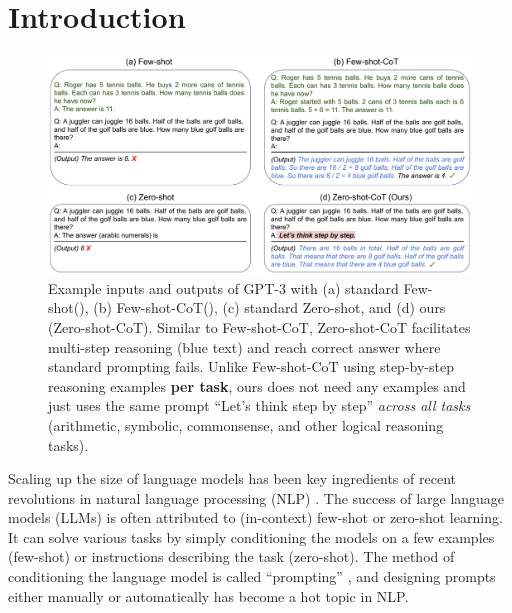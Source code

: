 \documentclass{article}
\newcommand{\kojima}[1]{{\color{red}[{#1} --TK]}}
\newcommand{\yi}[1]{{\color{magenta}[{#1} --YI]}}
\newcommand{\ours}{Zero-shot-CoT\xspace}
\newcommand{\theirs}{Few-shot-CoT\xspace}
\newcommand{\theirsz}{Zero-shot\xspace}
\newcommand{\theirsf}{Few-shot\xspace}
\begin{document}

\section{Introduction}

\begin{figure}[t]
  \begin{center}
   \includegraphics[width=\columnwidth]{conceptual_differences.pdf}
  \end{center}
  \caption{Example inputs and outputs of GPT-3 with (a) standard \theirsf (\citep{brown2020language}), (b) \theirs (\citep{cot_wei}), (c) standard \theirsz, and (d) ours (\ours). 
  Similar to \theirs, \ours facilitates multi-step reasoning (blue text) and reach correct answer where standard prompting fails. 
  Unlike \theirs using step-by-step reasoning examples \textbf{per task}, ours does not need any examples and just uses the same prompt ``Let's think step by step'' \textit{across all tasks} (arithmetic, symbolic, commonsense, and other logical reasoning tasks).
  }
  \label{fig_overview_1}
\end{figure}

Scaling up the size of language models has been key ingredients of recent revolutions in natural language processing (NLP) \citep{transformer, bert, t5, brown2020language, lamda, gopher, palm}. 
The success of large language models (LLMs) is often attributed to (in-context) few-shot or zero-shot learning. It can solve various tasks by simply conditioning the models on a few examples (few-shot) or instructions describing the task (zero-shot). 
The method of conditioning the language model is called ``prompting'' \citep{liu2021pre}, and designing prompts either manually \citep{schick2020s,prompt1} or automatically \citep{gao2021making,shin2020autoprompt} has become a hot topic in NLP. 
\end{document}

